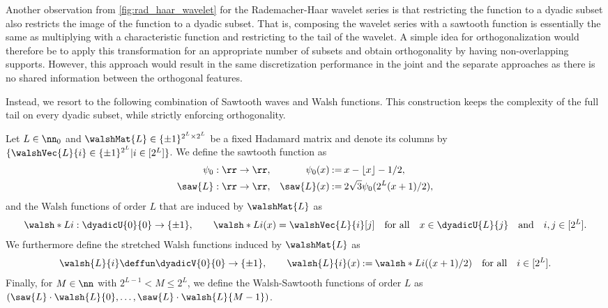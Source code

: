 \documentclass[twoside,11pt]{article}
\newcommand{\defeq}{\mathbin{:=}}
\begin{document}
Another observation from \cref{fig:rad_haar_wavelet} for the Rademacher-Haar wavelet series is that restricting the function to a dyadic subset also restricts the image of the function to a dyadic subset.
That is, composing the wavelet series with a sawtooth function is essentially the same as multiplying with a characteristic function and restricting to the tail of the wavelet.
A simple idea for orthogonalization would therefore be to apply this transformation for an appropriate number of subsets and obtain orthogonality by having non-overlapping supports.
However, this approach would result in the same discretization performance in the joint and the separate approaches as there is no shared information between the orthogonal features.

Instead, we resort to the following combination of Sawtooth waves and Walsh functions.
This construction keeps the complexity of the full tail on every dyadic subset, while strictly enforcing orthogonality.
\begin{definition}
    Let $L\in\nn_0$ and $\walshMat{L}\in\{\pm 1\}^{2^L\times 2^L}$ be a fixed Hadamard matrix and denote its columns by $\{\walshVec{L}{i}\in\{\pm 1\}^{2^L}|i\in[2^L]\}$.
    We define the sawtooth function as
    \begin{align}
        \psi_0&:\rr \to \rr, & \psi_0(x)&\defeq x - \lfloor x\rfloor - 1/2,\\
        \saw{L}&:\rr \to \rr, & \saw{L}(x)&\defeq2\sqrt{3}\psi_0(2^L(x+1)/2),
    \end{align}
    and the Walsh functions of order $L$ that are induced by $\walshMat{L}$ as%
    \begin{align}
        \walsh*{L}{i}:\dyadicU{0}{0}\to\{\pm 1\},
        \qquad
        \walsh*{L}{i}(x)=\walshVec{L}{i}[j]\quad\text{for all}\quad x\in\dyadicU{L}{j}\quad\text{and}\quad i,j\in[2^L].
    \end{align}
    We furthermore define the stretched Walsh functions induced by $\walshMat{L}$ as 
    \begin{align}\walsh{L}{i}\deffun \dyadicV{0}{0}\to \{\pm 1\},\qquad\walsh{L}{i}(x)\defeq \walsh*{L}{i}((x+1)/2)\quad\text{for all}\quad i\in[2^L].\end{align}
    Finally, for $M\in\nn$ with $2^{L-1}< M\leq 2^L$, we define the Walsh-Sawtooth functions of order $L$ as $(\saw{L}\cdot\walsh{L}{0},\ldots,\saw{L}\cdot\walsh{L}{M-1})$.
\end{definition}
\end{document}
